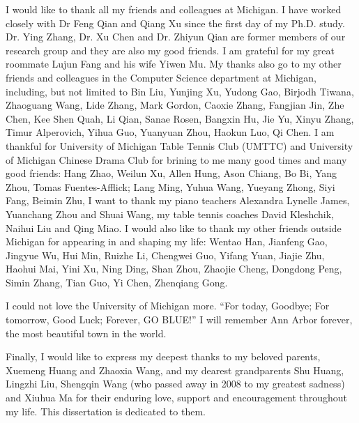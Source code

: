 I would like to thank all my friends and colleagues at Michigan. I have worked closely with Dr Feng Qian and Qiang Xu since the first day of my Ph.D. study. Dr. Ying Zhang, Dr. Xu Chen and Dr. Zhiyun Qian are former members of our research group and they are also my good friends. I am grateful for my great roommate Lujun Fang and his wife Yiwen Mu. My thanks also go to my other friends and colleagues in the Computer Science department at Michigan, including, but not limited to Bin Liu, Yunjing Xu, Yudong Gao, Birjodh Tiwana, Zhaoguang Wang, Lide Zhang, Mark Gordon, Caoxie Zhang, Fangjian Jin, Zhe Chen, Kee Shen Quah, Li Qian, Sanae Rosen, Bangxin Hu, Jie Yu, Xinyu Zhang, Timur Alperovich, Yihua Guo, Yuanyuan Zhou, Haokun Luo, Qi Chen. I am thankful for University of Michigan Table Tennis Club (UMTTC) and University of Michigan Chinese Drama Club for brining to me many good times and many good friends: Hang Zhao, Weilun Xu, Allen Hung, Ason Chiang, Bo Bi, Yang Zhou, Tomas Fuentes-Afflick; Lang Ming, Yuhua Wang, Yueyang Zhong, Siyi Fang, Beimin Zhu, \etc I want to thank my piano teachers Alexandra Lynelle James, Yuanchang Zhou and Shuai Wang, my table tennis coaches David Kleshchik, Naihui Liu and Qing Miao. I would also like to thank my other friends outside Michigan for appearing in and shaping my life: Wentao Han, Jianfeng Gao, Jingyue Wu, Hui Min, Ruizhe Li, Chengwei Guo, Yifang Yuan, Jiajie Zhu, Haohui Mai, Yini Xu, Ning Ding, Shan Zhou, Zhaojie Cheng, Dongdong Peng, Simin Zhang, Tian Guo, Yi Chen, Zhenqiang Gong.

I could not love the University of Michigan more. ``For today, Goodbye; For tomorrow, Good Luck; Forever, GO BLUE!'' I will remember Ann Arbor forever, the most beautiful town in the world.

Finally, I would like to express my deepest thanks to my beloved parents, Xuemeng Huang and Zhaoxia Wang, and my dearest grandparents Shu Huang, Lingzhi Liu, Shengqin Wang (who passed away in 2008 to my greatest sadness) and Xiuhua Ma for their enduring love, support and encouragement throughout my life. This dissertation is dedicated to them.

\label{ACKNOWLEDGEMENTS}
